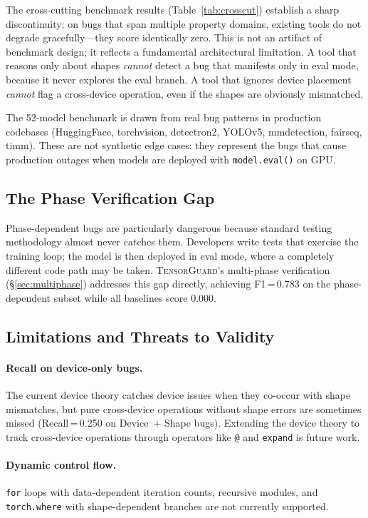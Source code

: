\documentclass[10pt]{article}
\newcommand{\tguard}{\textsc{TensorGuard}}
\theoremstyle{plain}
\theoremstyle{definition}
\theoremstyle{remark}
\begin{document}
The cross-cutting benchmark results
(Table~\ref{tab:crosscut}) establish a sharp discontinuity: on bugs
that span multiple property domains, existing tools do not degrade
gracefully---they score identically zero.  This is not an artifact of
benchmark design; it reflects a fundamental architectural limitation.
A tool that reasons only about shapes \emph{cannot} detect a bug
that manifests only in eval mode, because it never explores the eval
branch.  A tool that ignores device placement \emph{cannot} flag a
cross-device operation, even if the shapes are obviously mismatched.

The 52-model benchmark is drawn from real bug patterns in production
codebases (HuggingFace, torchvision, detectron2, YOLOv5, mmdetection,
fairseq, timm).  These are not synthetic edge cases: they represent
the bugs that cause production outages when models are deployed with
\texttt{model.eval()} on GPU.

\subsection{The Phase Verification Gap}

Phase-dependent bugs are particularly dangerous because standard
testing methodology almost never catches them.  Developers write
tests that exercise the training loop; the model is then deployed
in eval mode, where a completely different code path may be taken.
\tguard{}'s multi-phase verification (\S\ref{sec:multiphase})
addresses this gap directly, achieving F1\,=\,0.783 on the
phase-dependent subset while all baselines score 0.000.

\subsection{Limitations and Threats to Validity}

\paragraph{Recall on device-only bugs.}
The current device theory catches device issues when they co-occur
with shape mismatches, but pure cross-device operations without
shape errors are sometimes missed (Recall\,=\,0.250 on Device~$+$
Shape bugs).  Extending the device theory to track cross-device
operations through operators like \texttt{@} and \texttt{expand} is
future work.

\paragraph{Dynamic control flow.}
\texttt{for} loops with data-dependent iteration counts, recursive
modules, and \texttt{torch.where} with shape-dependent branches are
not currently supported.
\end{document}
